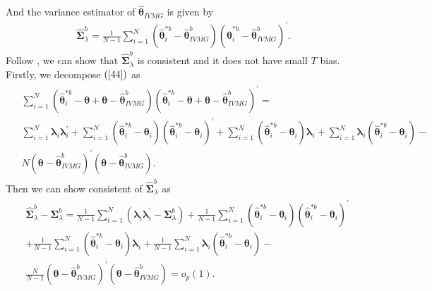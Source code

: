 \documentclass[12pt,a4paper,hyperref]{article}
\begin{document}
And the variance estimator of $\hat{\boldsymbol{\theta}}_{IVMG}$ is given by
\begin{align}
\hat{\boldsymbol{\Sigma}}^{b}_{\lambda}=\frac{1}{N-1}\sum^{N}_{i=1}\left( \hat{\boldsymbol{\theta}}^{\ast b}_{i}- \hat{\boldsymbol{\theta}}^{b}_{IVMG}\right)\left( \hat{\boldsymbol{\theta}}^{\ast b}_{i}- \hat{\boldsymbol{\theta}}^{b}_{IVMG}\right)^{'}. \label{44}
\end{align}
Follow \citet{Norkute:2019}, we can show that $\hat{\boldsymbol{\Sigma}}^{b}_{\lambda}$ is consistent and it does not have small $T$ bias.
Firstly, we decompose $(\ref{44})$ as
\begin{align}
\begin{split}
&\sum^{N}_{i=1}\left( \hat{\boldsymbol{\theta}}^{\ast b}_{i}- \boldsymbol{\theta}+\boldsymbol{\theta}-    \hat{\boldsymbol{\theta}}^{b}_{IVMG}\right)\left( \hat{\boldsymbol{\theta}}^{\ast b}_{i}- \boldsymbol{\theta}+\boldsymbol{\theta}-    \hat{\boldsymbol{\theta}}^{b}_{IVMG}\right)^{'}= \\
& \sum^{N}_{i=1} \boldsymbol{\lambda}_{i}\boldsymbol{\lambda}^{'}_{i}+\sum^{N}_{i=1}\left(\hat{\boldsymbol{\theta}}^{\ast b}_{i}-\boldsymbol{\theta}_{i} \right)\left(\hat{\boldsymbol{\theta}}^{\ast b}_{i}-\boldsymbol{\theta}_{i} \right)^{'}+\sum^{N}_{i=1}\left(\hat{\boldsymbol{\theta}}^{\ast b}_{i}-\boldsymbol{\theta}_{i}  \right) \boldsymbol{\lambda}_{i}+\sum^{N}_{i=1}\boldsymbol{\lambda}_{i} \left(\hat{\boldsymbol{\theta}}^{\ast b}_{i}-\boldsymbol{\theta}_{i}  \right) -\\
&N\left(\boldsymbol{\theta}-\hat{\boldsymbol{\theta}}^{b}_{IVMG} \right)^{'}\left(\boldsymbol{\theta}-\hat{\boldsymbol{\theta}}^{b}_{IVMG} \right). \label{45}
\end{split}
\end{align}
Then we can show consistent of $\hat{\boldsymbol{\Sigma}}^{b}_{\lambda}$ as
\begin{align}
\begin{split}
&\hat{\boldsymbol{\Sigma}}^{b}_{\lambda}-\boldsymbol{\Sigma}^{b}_{\lambda}=
 \frac{1}{N-1}\sum^{N}_{i=1}\left( \boldsymbol{\lambda}_{i}\boldsymbol{\lambda}^{'}_{i}-\boldsymbol{\Sigma}^{b}_{\lambda}\right) +\frac{1}{N-1}\sum^{N}_{i=1}\left(\hat{\boldsymbol{\theta}}^{\ast b}_{i}-\boldsymbol{\theta}_{i} \right)\left(\hat{\boldsymbol{\theta}}^{\ast b}_{i}-\boldsymbol{\theta}_{i} \right)^{'} \\
&+\frac{1}{N-1}\sum^{N}_{i=1}\left(\hat{\boldsymbol{\theta}}^{\ast b}_{i}-\boldsymbol{\theta}_{i}  \right) \boldsymbol{\lambda}_{i}+\frac{1}{N-1}\sum^{N}_{i=1}\boldsymbol{\lambda}_{i} \left(\hat{\boldsymbol{\theta}}^{\ast b}_{i}-\boldsymbol{\theta}_{i}  \right) -\\
&\frac{N}{N-1}\left(\boldsymbol{\theta}-\hat{\boldsymbol{\theta}}^{b}_{IVMG} \right)^{'}\left(\boldsymbol{\theta}-\hat{\boldsymbol{\theta}}^{b}_{IVMG} \right)  =o_{p}(1).
\end{split}
\end{align}
\end{document}
